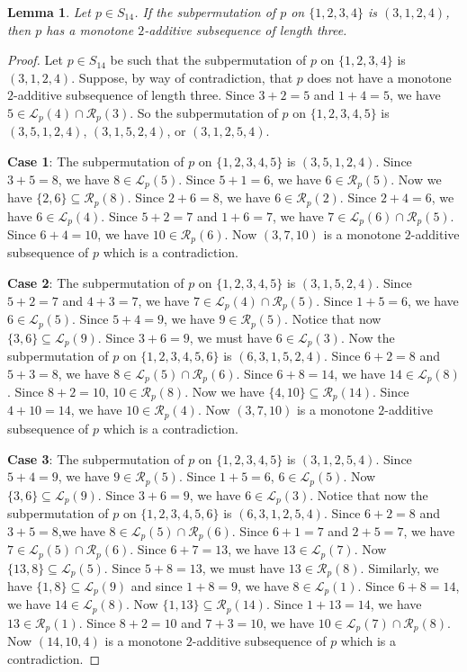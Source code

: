 \documentclass[10pt,a4paper]{amsart}
\newtheorem{lemma}[theorem]{Lemma}
\begin{document}
\begin{lemma}\label{Lemma:Monotone3124}
Let $p\in S_{14}$. If the subpermutation of $p$ on $\{1,2,3,4\}$ is $(3,1,2,4)$, then $p$ has a monotone $2$-additive subsequence of length three.
\end{lemma}
\begin{proof}
     Let $p\in S_{14}$ be such that the subpermutation of $p$ on $\{1,2,3,4\}$ is $(3,1,2,4)$. Suppose, by way of contradiction, that $p$ does not have a monotone $2$-additive subsequence of length three. Since $3+2=5$ and $1+4=5$, we have $5\in\mathcal{L}_p(4)\cap\mathcal{R}_p(3)$. So the subpermutation of $p$ on $\{1,2,3,4,5\}$ is $(3,5,1,2,4)$, $(3,1,5,2,4)$, or $(3,1,2,5,4)$.

     {\bf Case 1}: The subpermutation of $p$ on $\{1,2,3,4,5\}$ is $(3,5,1,2,4)$. Since $3+5=8$, we have $8\in\mathcal{L}_p(5)$. Since $5+1=6$, we have $6\in\mathcal{R}_p(5)$. Now we have $\{2,6\}\subseteq\mathcal{R}_p(8)$. Since $2+6=8$, we have $6\in\mathcal{R}_p(2)$. Since $2+4=6$, we have $6\in\mathcal{L}_p(4)$. Since $5+2=7$ and $1+6=7$, we have $7\in\mathcal{L}_p(6)\cap\mathcal{R}_p(5)$. Since $6+4=10$, we have $10\in\mathcal{R}_p(6)$. Now $(3,7,10)$ is a monotone $2$-additive subsequence of $p$ which is a contradiction.

     {\bf Case 2}: The subpermutation of $p$ on $\{1,2,3,4,5\}$ is $(3,1,5,2,4)$. Since $5+2=7$ and $4+3=7$, we have $7\in\mathcal{L}_p(4)\cap\mathcal{R}_p(5)$. Since $1+5=6$, we have $6\in\mathcal{L}_p(5)$. Since $5+4=9$, we have $9\in\mathcal{R}_p(5)$. Notice that now $\{3,6\}\subseteq\mathcal{L}_p(9)$. Since $3+6=9$, we must have $6\in\mathcal{L}_p(3)$. Now the subpermutation of $p$ on $\{1,2,3,4,5,6\}$ is $(6,3,1,5,2,4)$. Since $6+2=8$ and $5+3=8$, we have $8\in\mathcal{L}_p(5)\cap\mathcal{R}_p(6)$. Since $6+8=14$, we have $14\in\mathcal{L}_p(8)$. Since $8+2=10$, $10\in\mathcal{R}_p(8)$. Now we have $\{4,10\}\subseteq\mathcal{R}_p(14)$. Since $4+10=14$, we have $10\in\mathcal{R}_p(4)$. Now $(3,7,10)$ is a monotone $2$-additive subsequence of $p$ which is a contradiction.

     {\bf Case 3}: The subpermutation of $p$ on $\{1,2,3,4,5\}$ is $(3,1,2,5,4)$. Since $5+4=9$, we have $9\in\mathcal{R}_p(5)$. Since $1+5=6$, $6\in\mathcal{L}_p(5)$. Now $\{3,6\}\subseteq\mathcal{L}_p(9)$. Since $3+6=9$, we have $6\in\mathcal{L}_p(3)$. Notice that now the subpermutation of $p$ on $\{1,2,3,4,5,6\}$ is $(6,3,1,2,5,4)$. Since $6+2=8$ and $3+5=8$,we have $8\in\mathcal{L}_p(5)\cap\mathcal{R}_p(6)$. Since $6+1=7$ and $2+5=7$, we have $7\in\mathcal{L}_p(5)\cap\mathcal{R}_p(6)$. Since $6+7=13$, we have $13\in\mathcal{L}_p(7)$. Now $\{13,8\}\subseteq\mathcal{L}_p(5)$. Since $5+8=13$, we must have $13\in\mathcal{R}_p(8)$. Similarly, we have $\{1,8\}\subseteq\mathcal{L}_p(9)$ and since $1+8=9$, we have $8\in\mathcal{L}_p(1)$. Since $6+8=14$, we have $14\in\mathcal{L}_p(8)$. Now $\{1,13\}\subseteq\mathcal{R}_p(14)$. Since $1+13=14$, we have $13\in\mathcal{R}_p(1)$. Since $8+2=10$ and $7+3=10$, we have $10\in\mathcal{L}_p(7)\cap\mathcal{R}_p(8)$. Now $(14,10,4)$ is a monotone $2$-additive subsequence of $p$ which is a contradiction.
\end{proof}
\end{document}
